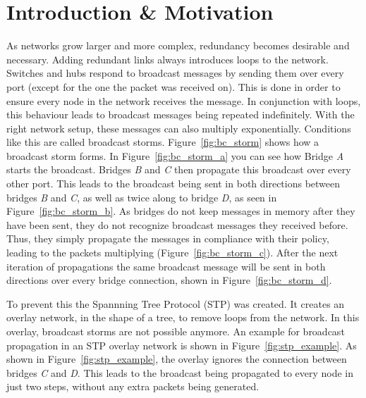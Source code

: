 \chapter{Introduction \& Motivation}
\label{introduction}
As networks grow larger and more complex, redundancy becomes desirable and necessary.
Adding redundant links always introduces loops to the network.
Switches and hubs respond to broadcast messages by sending them over every port (except for the one the packet was received on).
This is done in order to ensure every node in the network receives the message.
In conjunction with loops, this behaviour leads to broadcast messages being repeated indefinitely.
With the right network setup, these messages can also multiply exponentially. 
Conditions like this are called broadcast storms\cite{bstorm}.
Figure~\ref{fig:bc_storm} shows how a broadcast storm forms.
In Figure~\ref{fig:bc_storm_a} you can see how Bridge \textit{A} starts the broadcast.
Bridges \textit{B} and \textit{C} then propagate this broadcast over every other port.
This leads to the broadcast being sent in both directions between bridges \textit{B} and \textit{C}, as well as twice along to bridge \textit{D}, as seen in Figure~\ref{fig:bc_storm_b}.
As bridges do not keep messages in memory after they have been sent, they do not recognize broadcast messages they received before.
Thus, they simply propagate the messages in compliance with their policy, leading to the packets multiplying (Figure~\ref{fig:bc_storm_c}).
After the next iteration of propagations the same broadcast message will be sent in both directions over every bridge connection, shown in Figure~\ref{fig:bc_storm_d}.

To prevent this the Spannning Tree Protocol (STP)\cite{perlman85} was created.
It creates an overlay network, in the shape of a tree, to remove loops from the network.
In this overlay, broadcast storms are not possible anymore.
An example for broadcast propagation in an STP overlay network is shown in Figure~\ref{fig:stp_example}.
As shown in Figure~\ref{fig:stp_example}, the overlay ignores the connection between bridges \textit{C} and \textit{D}.
This leads to the broadcast being propagated to every node in just two steps, without any extra packets being generated.

